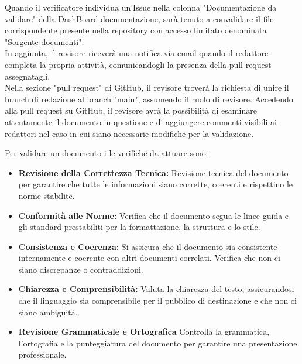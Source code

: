 \documentclass{article}
\begin{document}
Quando il verificatore individua un'Issue nella colonna "Documentazione da validare" della  \href{https://github.com/orgs/ByteOps-swe/projects/1/views/1}{DashBoard documentazione}, sarà tenuto a convalidare il file corrispondente presente nella repository con accesso limitato denominata "Sorgente documenti". \\
In aggiunta, il revisore riceverà una notifica via email quando il redattore completa la propria attività, comunicandogli la presenza della pull request assegnatagli.\\
Nella sezione "pull request" di GitHub, il revisore troverà la richiesta di unire il branch di redazione al branch "main", assumendo il ruolo di revisore. Accedendo alla pull request su GitHub, il revisore avrà la possibilità di esaminare attentamente il documento in questione e di aggiungere commenti visibili ai redattori nel caso in cui siano necessarie modifiche per la validazione.

\vspace{0.3cm}

Per validare un documento i le verifiche da attuare sono:
\begin{itemize}
    \item \textbf{Revisione della Correttezza Tecnica:} Revisione tecnica del documento per garantire che tutte le informazioni siano corrette, coerenti e rispettino le norme stabilite.
     \item \textbf{Conformità alle Norme:} Verifica che il documento segua le linee guida e gli standard prestabiliti per la formattazione, la struttura e lo stile.
      \item \textbf{Consistenza e Coerenza:} Si assicura che il documento sia consistente internamente e coerente con altri documenti correlati. Verifica che non ci siano discrepanze o contraddizioni.
      \item \textbf{Chiarezza e Comprensibilità:} Valuta la chiarezza del testo, assicurandosi che il linguaggio sia comprensibile per il pubblico di destinazione e che non ci siano ambiguità.
      \item \textbf{Revisione Grammaticale e Ortografica} Controlla la grammatica, l'ortografia e la punteggiatura del documento per garantire una presentazione professionale.
\end{itemize}
\end{document}
